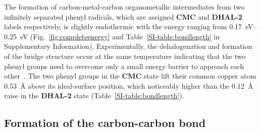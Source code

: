 \documentclass[%
 reprint,
 amsmath,amssymb,
 aps,
prb,
floatfix,
]{revtex4-2}
\newcommand{\lock}{\color{red}}
\newcommand{\lock}{\color{black}}
\newcommand{\sinfo}{Supplementary Information}
\begin{document}
{\lock

The formation of carbon-metal-carbon organometallic intermediates from two infinitely separated phenyl radicals, which are assigned \textbf{CMC} and \textbf{DHAL-2} labels respectively, is slightly endothermic with the energy ranging from \SIrange{0.17}{0.25}{\electronvolt} (Fig.~\ref{fig:completeenergy} and Table~\ref{SI-table:bondlength} in \sinfo). Experimentally, the dehalogenation and formation of the bridge structure occur at the same temperature indicating that the two phenyl groups need to overcome only a small energy barrier to approach each other~\cite{pccp2010}. 
%
The two phenyl groups in the \textbf{CMC} state lift their common copper atom \SI{0.53}{\angstrom} above its ideal-surface position, which noticeably higher than the \SI{0.12}{\angstrom} raise in the \textbf{DHAL-2} state (Table~\ref{SI-table:bondlength}).




}

\ifdefined\INTERNAL
\subsection{Formation of the carbon-carbon bond}
\fi
\end{document}
